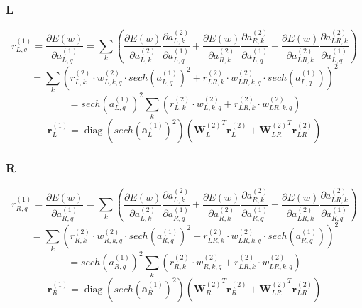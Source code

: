 \documentclass[11pt]{article}
\DeclareMathOperator*{\diag}{diag}
\begin{document}
\subsubsection*{L} 
$$r^{(1)}_{L,q} = \frac{\partial E(w)}{\partial a^{(1)}_{L,q}} =\sum_{k} ( \frac{\partial E(w)}{\partial a^{(2)}_{L,k}} \frac{\partial a^{(2)}_{L,k}}{\partial a^{(1)}_{L,q}} + \frac{\partial E(w)}{\partial a^{(2)}_{R,k}} \frac{\partial a^{(2)}_{R,k}}{\partial a^{(1)}_{L,q}} +  \frac{\partial E(w)}{\partial a^{(2)}_{LR,k}} \frac{\partial a^{(2)}_{LR,k}}{\partial a^{(1)}_{L,q}} )$$
$$= \sum_{k} (r^{(2)}_{L,k}\cdot w_{L,k,q}^{(2)}\cdot sech(a_{L,q}^{(1)})^2 + r^{(2)}_{LR,k} \cdot w_{LR,k,q}^{(2)}\cdot sech(a_{L,q}^{(1)}))^2$$
$$= sech(a_{L,q}^{(1)})^2 \sum_{k} (r^{(2)}_{L,k}\cdot w_{L,k,q}^{(2)} +r^{(2)}_{LR,k} \cdot w_{LR,k,q}^{(2)}) $$
$$\mathbf{r}^{(1)}_{L} = \diag (sech(\mathbf{a}_{L}^{(1)})^2) ( {\mathbf{W}_{L}^{(2)}}^T \mathbf{r}_{L}^{(2)} + {\mathbf{W}_{LR}^{(2)}}^T \mathbf{r}_{LR}^{(2)}) $$
\subsubsection*{R}
$$r^{(1)}_{R,q} = \frac{\partial E(w)}{\partial a^{(1)}_{R,q}} =\sum_{k} ( \frac{\partial E(w)}{\partial a^{(2)}_{L,k}} \frac{\partial a^{(2)}_{L,k}}{\partial a^{(1)}_{R,q}} + \frac{\partial E(w)}{\partial a^{(2)}_{R,k}} \frac{\partial a^{(2)}_{R,k}}{\partial a^{(1)}_{R,q}} +  \frac{\partial E(w)}{\partial a^{(2)}_{LR,k}} \frac{\partial a^{(2)}_{LR,k}}{\partial a^{(1)}_{R,q}} )$$
$$= \sum_{k} (r^{(2)}_{R,k}\cdot w_{R,k,q}^{(2)}\cdot sech(a_{R,q}^{(1)})^2 + r^{(2)}_{LR,k} \cdot w_{LR,k,q}^{(2)}\cdot sech(a_{R,q}^{(1)}))^2$$
$$= sech(a_{R,q}^{(1)})^2 \sum_{k} (r^{(2)}_{R,k}\cdot w_{R,k,q}^{(2)} +r^{(2)}_{LR,k} \cdot w_{LR,k,q}^{(2)}) $$
$$\mathbf{r}^{(1)}_{R} = \diag (sech(\mathbf{a}_{R}^{(1)})^2) ( {\mathbf{W}_{R}^{(2)}}^T \mathbf{r}_{R}^{(2)} + {\mathbf{W}_{LR}^{(2)}}^T \mathbf{r}_{LR}^{(2)}) $$
\end{document}
